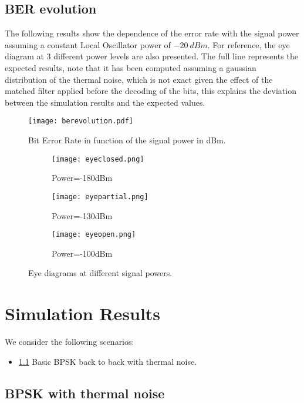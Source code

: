 \documentclass[a4paper]{article}
\begin{document}
\subsection{BER evolution}

The following results show the dependence of the error rate with the signal power assuming a constant Local Oscillator power of $-20~dBm$. For reference, the eye diagram at 3 different power levels are also presented. The full line represents the expected results, note that it has been computed assuming a gaussian distribution of the thermal noise, which is not exact given the effect of the matched filter applied before the decoding of the bits, this explains the deviation between the simulation results and the expected values.

\begin{figure}[H]
\centering
\texttt{[image: berevolution.pdf]}
\caption{Bit Error Rate in function of the signal power in dBm.}
\label{fig:berevolution}
\end{figure}

\begin{figure}[H]
\centering
\begin{subfigure}{.3\linewidth}
\texttt{[image: eyeclosed.png]}
\caption{Power=-180dBm}
\end{subfigure}
\begin{subfigure}{.3\linewidth}
\texttt{[image: eyepartial.png]}
\caption{Power=-130dBm}
\end{subfigure}
\begin{subfigure}{.3\linewidth}
\texttt{[image: eyeopen.png]}
\caption{Power=-100dBm}
\end{subfigure}
\caption{Eye diagrams at different signal powers.}
\end{figure}


\section{Simulation Results}

We consider the following scenarios:
\begin{itemize}
\item \ref{subsec:scenario1} Basic BPSK back to back with  thermal noise.
\end{itemize}

\subsection{BPSK with thermal noise}\label{subsec:scenario1}
\end{document}
